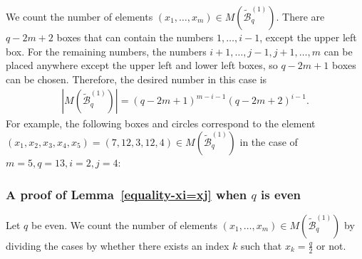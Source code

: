 \documentclass{article}
\theoremstyle{plain}
\theoremstyle{definition}
\theoremstyle{remark}
\numberwithin{equation}{section}
\begin{document}
We count the number of elements $(x_1,\dots,x_m)\in M(\mathcal{\widetilde{B}}^{(1)}_q)$.
There are $q-2m+2$ boxes that can contain the numbers $1,\dots,i-1$, except the upper left box.
For the remaining numbers, the numbers $i+1,\dots,j-1, j+1,\dots,m$ can be placed anywhere except the upper left and lower left boxes, so $q-2m+1$ boxes can be chosen.
Therefore, the desired number in this case is 
\begin{align*}
        \left|M(\mathcal{\widetilde{B}}^{(1)}_q)\right| = (q-2m+1)^{m-i-1}(q-2m+2)^{i-1}.
\end{align*}
For example, the following boxes and circles correspond to the element $(x_1,x_2,x_3,x_4,x_5)=(7,12,3,12,4)\in M(\mathcal{\widetilde{B}}^{(1)}_q)$ in the case of $m=5,q=13,i=2,j=4$:
\begin{center}
\end{center}



\subsubsection{A proof of Lemma~\ref{equality-xi=xj} when $q$ is even}\label{sec-quasi-poly-restxi=xj-even}
Let $q$ be even.
We count the number of elements $(x_1,\dots,x_m)\in M(\mathcal{\widetilde{B}}^{(1)}_q)$ by dividing the cases by whether there exists an index $k$ such that $\displaystyle x_k=\frac{q}{2}$ or not.
\end{document}
